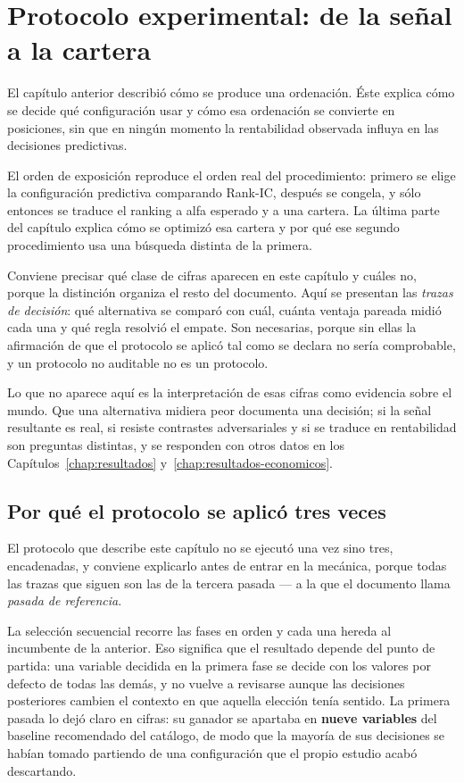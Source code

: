 \chapter{Protocolo experimental: de la señal a la cartera}
\label{chap:diseno-experimental}

El capítulo anterior describió cómo se produce una ordenación. Éste explica cómo se decide qué
configuración usar y cómo esa ordenación se convierte en posiciones, sin que en ningún momento la
rentabilidad observada influya en las decisiones predictivas.

El orden de exposición reproduce el orden real del procedimiento: primero se elige la configuración
predictiva comparando Rank-IC, después se congela, y sólo entonces se traduce el ranking a alfa
esperado y a una cartera. La última parte del capítulo explica cómo se optimizó esa cartera y por
qué ese segundo procedimiento usa una búsqueda distinta de la primera.

Conviene precisar qué clase de cifras aparecen en este capítulo y cuáles no, porque la distinción
organiza el resto del documento. Aquí se presentan las \emph{trazas de decisión}: qué alternativa se
comparó con cuál, cuánta ventaja pareada midió cada una y qué regla resolvió el empate. Son
necesarias, porque sin ellas la afirmación de que el protocolo se aplicó tal como se declara no
sería comprobable, y un protocolo no auditable no es un protocolo.

Lo que no aparece aquí es la interpretación de esas cifras como evidencia sobre el mundo. Que una
alternativa midiera peor documenta una decisión; si la señal resultante es real, si resiste
contrastes adversariales y si se traduce en rentabilidad son preguntas distintas, y se responden con
otros datos en los Capítulos~\ref{chap:resultados} y~\ref{chap:resultados-economicos}.

\section{Por qué el protocolo se aplicó tres veces}
\label{sec:cadena-studies}

El protocolo que describe este capítulo no se ejecutó una vez sino tres, encadenadas, y conviene
explicarlo antes de entrar en la mecánica, porque todas las trazas que siguen son las de la tercera
pasada --- a la que el documento llama \emph{pasada de referencia}.

La selección secuencial recorre las fases en orden y cada una hereda al incumbente de la anterior.
Eso significa que el resultado depende del punto de partida: una variable decidida en la primera
fase se decide con los valores por defecto de todas las demás, y no vuelve a revisarse aunque las
decisiones posteriores cambien el contexto en que aquella elección tenía sentido. La primera pasada
lo dejó claro en cifras: su ganador se apartaba en \textbf{nueve variables} del baseline recomendado
del catálogo, de modo que la mayoría de sus decisiones se habían tomado partiendo de una
configuración que el propio estudio acabó descartando.

